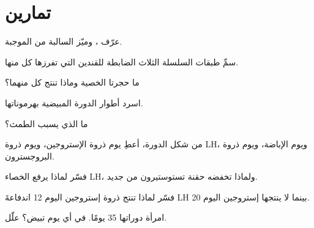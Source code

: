 \section{تمارين}

\begin{exercise}[$\star$]\label{exo:g11:hormones-and-reproduction:1}
عرّف  ، وميّز  السالبة من
الموجبة.
\end{exercise}

\begin{exercise}[$\star$]\label{exo:g11:hormones-and-reproduction:2}
سمِّ طبقات السلسلة الثلاث الضابطة للقندين  التي تفرزها كل
منها.
\end{exercise}

\begin{exercise}[$\star$]\label{exo:g11:hormones-and-reproduction:3}
ما حجرتا الخصية وماذا تنتج كل منهما؟
\end{exercise}

\begin{exercise}[$\star$]\label{exo:g11:hormones-and-reproduction:4}
اسرد أطوار الدورة المبيضية بهرموناتها.
\end{exercise}

\begin{exercise}[$\star$]\label{exo:g11:hormones-and-reproduction:5}
ما الذي يسبب الطمث؟
\end{exercise}

\begin{exercise}[$\star\star$]\label{exo:g11:hormones-and-reproduction:6}
من شكل الدورة، أعطِ يوم ذروة الإستروجين، ويوم ذروة LH، ويوم الإباضة،
ويوم ذروة البروجسترون.
\end{exercise}

\begin{exercise}[$\star\star$]\label{exo:g11:hormones-and-reproduction:7}
فسّر لماذا يرفع الخصاء LH، ولماذا تخفضه حقنة تستوستيرون من جديد.
\end{exercise}

\begin{exercise}[$\star\star$]\label{exo:g11:hormones-and-reproduction:8}
فسّر لماذا تنتج ذروة إستروجين اليوم 12 اندفاعةَ LH بينما لا ينتجها
إستروجين اليوم 20.
\end{exercise}

\begin{exercise}[$\star\star$]\label{exo:g11:hormones-and-reproduction:9}
امرأة دوراتها 35 يومًا. في أي يوم تبيض؟ علّل.
\end{exercise}

